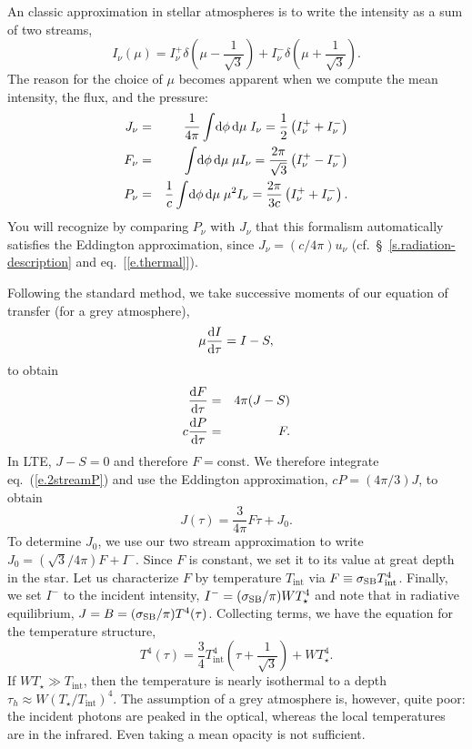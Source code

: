 An classic approximation in stellar atmospheres is to write the intensity as a sum of two streams,
\begin{equation}\label{e.two-stream}
I_{\nu}(\mu) = I_{\nu}^{+}\delta\left(\mu-\frac{1}{\sqrt{3}}\right) + I_{\nu}^{-}\delta\left(\mu + \frac{1}{\sqrt{3}}\right).
\end{equation}
The reason for the choice of $\mu$ becomes apparent when we compute the mean intensity, the flux, and the pressure:
\begin{eqnarray*}
J_{\nu} &=& \frac{1}{4\pi}\int\!\mathrm{d}\phi\,\mathrm{d}\mu\; I_{\nu} = \frac{1}{2}\left(I_{\nu}^{+} + I_{\nu}^{-}\right)\\
F_{\nu} &=& \int\!\mathrm{d}\phi\,\mathrm{d}\mu\;\mu I_{\nu} = \frac{2\pi}{\sqrt{3}} \left( I_{\nu}^{+} - I_{\nu}^{-}\right)\\
P_{\nu} &=& \frac{1}{c} \int\!\mathrm{d}\phi\,\mathrm{d}\mu\;\mu^{2} I_{\nu} = \frac{2\pi}{3c}\left(I_{\nu}^{+} + I_{\nu}^{-}\right).\\
\end{eqnarray*}
You will recognize by comparing $P_{\nu}$ with $J_{\nu}$ that this formalism automatically satisfies the Eddington approximation, since $J_{\nu} = (c/4\pi)u_{\nu}$ (cf.\ \S~\ref{s.radiation-description} and eq.~[\ref{e.thermal}]).

Following the standard method, we take successive moments of our equation of transfer (for a grey atmosphere),
\[ \mu\frac{\mathrm{d} I}{\mathrm{d} \tau} = I-S, \]
to obtain
\begin{eqnarray}
\frac{\mathrm{d} F}{\mathrm{d} \tau} &=& 4\pi (J - S) \label{e.2streamF}\\
c\frac{\mathrm{d} P}{\mathrm{d}\tau} &=& F. \label{e.2streamP}
\end{eqnarray}
In LTE, $J - S = 0$ and therefore $F = \textrm{const}$.  We therefore integrate eq.~(\ref{e.2streamP}) and use the Eddington approximation, $cP = (4\pi/3)J$, to obtain
\begin{equation}\label{e.2stream-1}
J(\tau) = \frac{3}{4\pi} F \tau + J_{0}.
\end{equation}
To determine $J_{0}$, we use our two stream approximation to write $J_{0} = (\sqrt{3}/4\pi)F + I^{-}$.  Since $F$ is constant, we set it to its value at great depth in the star.  Let us characterize $F$ by temperature $T_{\mathrm{int}}$ via $F \equiv \sigma_{\mathrm{SB}} T_{\mathrm{int}}^{4}$.  Finally, we set $I^{-}$ to the incident intensity, $I^{-} = (\sigma_{\mathrm{SB}}/\pi)WT_{\star}^{4}$ and note that in radiative equilibrium, $J = B = (\sigma_{\mathrm{SB}}/\pi) T^{4}(\tau)$. Collecting terms, we have the equation for the temperature structure,
\begin{equation}\label{e.T-irradiated}
T^{4}(\tau) = \frac{3}{4} T_{\mathrm{int}}^{4}\left(\tau + \frac{1}{\sqrt{3}}\right) + W T_{\star}^{4}.
\end{equation}
If $WT_{\star} \gg T_{\mathrm{int}}$, then the temperature is nearly isothermal to a depth $\tau_{h} \approx W(T_{\star}/T_{\mathrm{int}})^{4}$.
The assumption of a grey atmosphere is, however, quite poor: the incident photons are peaked in the optical, whereas the local temperatures are in the infrared. Even taking a mean opacity is not sufficient.

